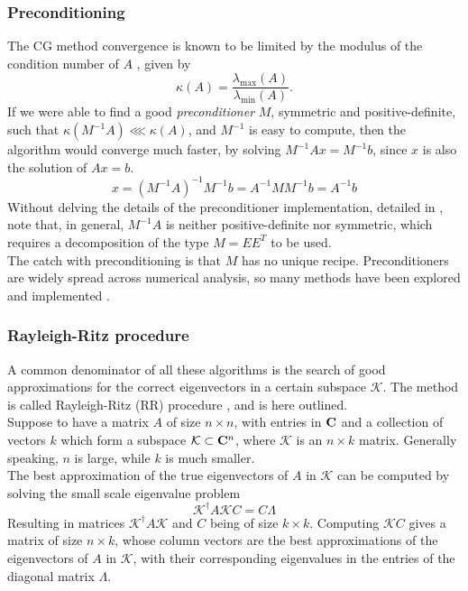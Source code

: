 \subsubsection{Preconditioning}
The CG method convergence is known to be limited by the modulus of the condition number of $A$ \cite{PainlessCGM}, given by 
\begin{equation}
    \label{eq:cond_num}
    \kappa(A) = \frac{\lambda_\text{max}(A)}{\lambda_\text{min}(A)}.
\end{equation}
If we were able to find a good \textit{preconditioner} $M$, symmetric and positive-definite, such that $\kappa(M^{-1}A) \lll \kappa(A)$, and $M^{-1}$ is easy to compute, then the algorithm would converge much faster, by solving $M^{-1}Ax = M^{-1}b$, since $x$ is also the solution of $Ax = b$.
\begin{equation}
    \label{eq:precond}
    x = (M^{-1}A)^{-1} M^{-1}b = A^{-1} MM^{-1} b = A^{-1} b
\end{equation}
Without delving the details of the preconditioner implementation, detailed in \cite{PainlessCGM}, note that, in general, $M^{-1}A$ is neither positive-definite nor symmetric, which requires a decomposition of the type $M = EE^T$ to be used.
\\The catch with preconditioning is that $M$ has no unique recipe. Preconditioners are widely spread across numerical analysis, so many methods have been explored and implemented \cite{pearson2020preconditioners}.
\subsubsection{Rayleigh-Ritz procedure}
A common denominator of all these algorithms is the search of good approximations for the correct eigenvectors in a certain subspace $\mathcal K$. The method is called Rayleigh-Ritz (RR) procedure \cite{Saad1992}, and is here outlined.
\\Suppose to have a matrix $A$ of size $n\times n$, with entries in $\mathbf{C}$ and a collection of vectors $k$ which form a subspace $\mathcal K \subset \mathbf{C}^n$, where $\mathcal K$ is an $n\times k$ matrix. Generally speaking, $n$ is large, while $k$ is much smaller.
\\The best approximation of the true eigenvectors of $A$ in $\mathcal K$ can be computed by solving the small scale eigenvalue problem
\begin{equation}
    \mathcal K^\dagger A  \mathcal K C = C\Lambda
\end{equation}
Resulting in matrices $\mathcal K^\dagger A \mathcal K$ and $C$ being of size $k\times k$.
Computing $\mathcal K C$ gives a matrix of size $n\times k$, whose column vectors are the best approximations of the eigenvectors of $A$ in $\mathcal K$, with their corresponding eigenvalues in the entries of the diagonal matrix $\Lambda$.
